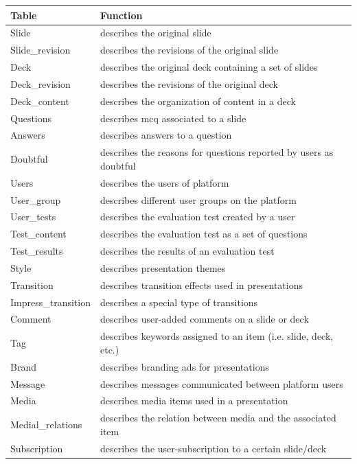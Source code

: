\documentclass[PhD, Submit, ngerman,UKenglish,table]{scrbook}
\begin{document}
\begin{table}[!ht]

\begin{tabulary}{1\columnwidth}{ll}
\toprule
\textbf{Table} & \textbf{Function} \\
\midrule

Slide & describes the original slide\\
Slide\_revision & describes the revisions of the original slide\\
Deck & describes the original deck containing a set of slides\\
Deck\_revision & describes the revisions of the original deck\\
Deck\_content & describes the organization of content in a deck\\
Questions & describes \gls{mcq} associated to a slide\\
Answers & describes answers to a question\\
Doubtful & describes the reasons for questions reported by users as doubtful\\
Users & describes the users of platform\\
User\_group & describes different user groups on the platform\\
User\_tests & describes the evaluation test created by a user\\
Test\_content & describes the evaluation test as a set of questions\\
Test\_results & describes the results of an evaluation test\\
Style & describes presentation themes \\
Transition & describes transition effects used in presentations\\
Impress\_transition & describes a special type of transitions\\
Comment & describes user-added comments on a slide or deck\\
Tag& describes keywords assigned to an item (i.e. slide, deck, etc.)\\
Brand & describes branding ads for presentations\\
Message & describes messages communicated between platform users\\
Media& describes media items used in a presentation\\
Medial\_relations & describes the relation between media and the associated item\\
Subscription & describes the user-subscription to a certain slide/deck\\

\end{tabulary}
\end{table}
\end{document}
